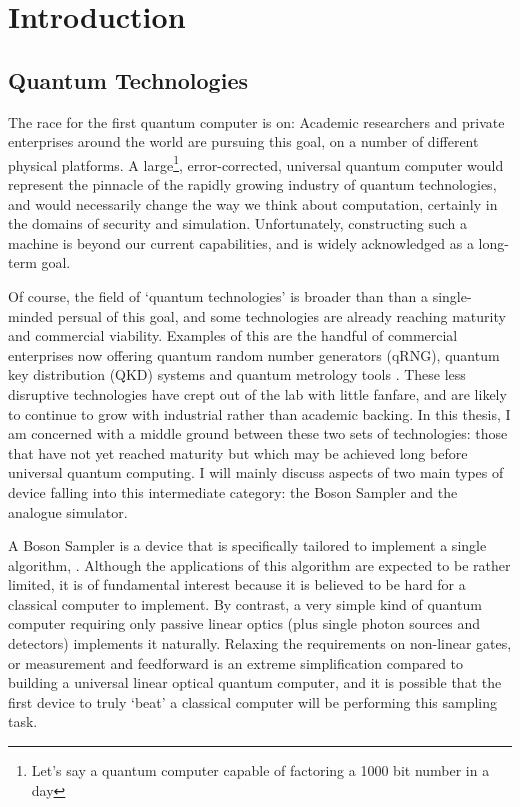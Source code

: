 \chapter{Introduction}
\label{ch:Introduction}
\section{Quantum Technologies}
\label{sec:Science}
The race for the first quantum computer is on: Academic researchers and private
enterprises \cite{dwave} around the world are pursuing this goal, on a number of
different physical platforms. A large\footnote{Let's say a quantum computer
capable of factoring a 1000 bit number in a day}, error-corrected, universal
quantum computer would represent the pinnacle of the rapidly growing industry
of quantum technologies, and would necessarily change the way we think about
computation, certainly in the domains of security and simulation. Unfortunately,
constructing such a machine is beyond our current capabilities, and is widely
acknowledged as a long-term goal.

Of course, the field of `quantum technologies' is broader than than a
single-minded persual of this goal,
and some technologies are already reaching maturity and
commercial viability. Examples of this are the handful of commercial enterprises
now offering quantum random number generators (qRNG), quantum key distribution
(QKD) systems and quantum metrology tools \cite{idquantique, magiq, qutools}.
These less disruptive technologies have crept out of the lab with little
fanfare, and are likely to continue to grow with industrial rather than
academic backing. In this thesis, I am concerned with a middle ground
between these two sets of technologies: those that have not yet reached maturity
but which may be achieved long before universal quantum computing. I will
mainly discuss aspects of two main types of device falling into this
intermediate category: the Boson Sampler and the analogue simulator. 

A Boson Sampler is a device that is specifically tailored to implement a
single algorithm, \bosonsampling{}. Although the applications of this algorithm
are expected to be rather limited, it is of fundamental interest because it is
believed to be hard for a classical computer to implement. By contrast, a very
simple kind of quantum computer requiring only passive linear optics (plus
single photon sources and detectors) implements it naturally. Relaxing the
requirements on non-linear gates, or measurement and feedforward is an extreme
simplification compared to building a universal linear optical quantum computer,
and it is possible that the first device to truly `beat' a classical computer
will be performing this sampling task.

